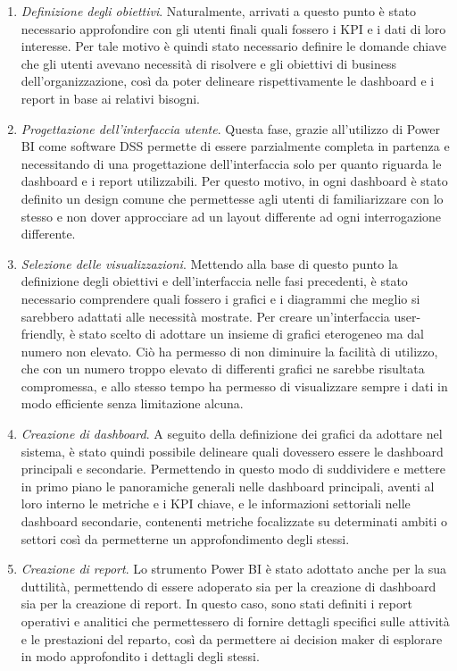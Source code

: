 \begin{enumerate}
    \item \textit{Definizione degli obiettivi}. Naturalmente, arrivati a questo punto è stato necessario approfondire con gli utenti finali quali fossero i KPI e i dati di loro interesse. Per tale motivo è quindi stato necessario definire le domande chiave che gli utenti avevano necessità di risolvere e gli obiettivi di business dell'organizzazione, così da poter delineare rispettivamente le dashboard e i report in base ai relativi bisogni.
    \item \textit{Progettazione dell'interfaccia utente}. Questa fase, grazie all'utilizzo di Power BI come software DSS permette di essere parzialmente completa in partenza e necessitando di una progettazione dell'interfaccia solo per quanto riguarda le dashboard e i report utilizzabili. Per questo motivo, in ogni dashboard è stato definito un design comune che permettesse agli utenti di familiarizzare con lo stesso e non dover approcciare ad un layout differente ad ogni interrogazione differente.
    \item \textit{Selezione delle visualizzazioni}. Mettendo alla base di questo punto la definizione degli obiettivi e dell'interfaccia nelle fasi precedenti, è stato necessario comprendere quali fossero i grafici e i diagrammi che meglio si sarebbero adattati alle necessità mostrate. Per creare un'interfaccia user-friendly, è stato scelto di adottare un insieme di grafici eterogeneo ma dal numero non elevato. Ciò ha permesso di non diminuire la facilità di utilizzo, che con un numero troppo elevato di differenti grafici ne sarebbe risultata compromessa, e allo stesso tempo ha permesso di visualizzare sempre i dati in modo efficiente senza limitazione alcuna.
    \item \textit{Creazione di dashboard}. A seguito della definizione dei grafici da adottare nel sistema, è stato quindi possibile delineare quali dovessero essere le dashboard principali e secondarie. Permettendo in questo modo di suddividere e mettere in primo piano le panoramiche generali nelle dashboard principali, aventi al loro interno le metriche e i KPI chiave, e le informazioni settoriali nelle dashboard secondarie, contenenti metriche focalizzate su determinati ambiti o settori così da permetterne un approfondimento degli stessi.
    \item \textit{Creazione di report}. Lo strumento Power BI è stato adottato anche per la sua duttilità, permettendo di essere adoperato sia per la creazione di dashboard sia per la creazione di report. In questo caso, sono stati definiti i report operativi e analitici che permettessero di fornire dettagli specifici sulle attività e le prestazioni del reparto, così da permettere ai decision maker di esplorare in modo approfondito i dettagli degli stessi.
\end{enumerate}

